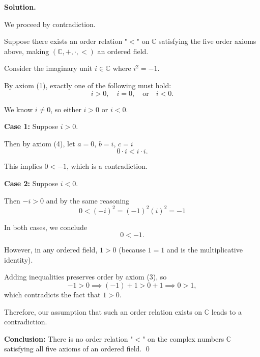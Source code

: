 \documentclass[12pt]{article}
\newenvironment{solution}{%
	\par\medskip
	\noindent\textbf{Solution.}\par\nopagebreak
}{%
	\hfill \qed \par\medskip
}
\begin{document}
\begin{solution}
	We proceed by contradiction.
	
	Suppose there exists an order relation "$<$" on $\mathbb{C}$ satisfying the five order axioms above, making $(\mathbb{C}, +, \cdot, <)$ an ordered field.
	
	Consider the imaginary unit $i \in \mathbb{C}$ where $i^2 = -1$.
	
	By axiom (1), exactly one of the following must hold:
	\[
	i > 0, \quad i = 0, \quad \text{or} \quad i < 0.
	\]
	
	We know $i \neq 0$, so either $i > 0$ or $i < 0$.
	
	\textbf{Case 1:} Suppose $i > 0$.
	
	Then by axiom (4), let $a = 0$, $b = i$, $c = i$
	\[
	0 \cdot i < i \cdot i.
	\]
	
	This implies $0 < -1$, which is a contradiction.
	
	\textbf{Case 2:} Suppose $i < 0$.
	
	Then $-i > 0$ and by the same reasoning
	\[
	0 < (-i)^2 = (-1)^2(i)^2 = -1
	\]
	
	In both cases, we conclude
	\[
	0 < -1.
	\]
	
	However, in any ordered field, $1 > 0$ (because $1 = 1$ and is the multiplicative identity).
	
	Adding inequalities preserves order by axiom (3), so
	\[
	-1 > 0 \implies (-1) + 1 > 0 + 1 \implies 0 > 1,
	\]
	which contradicts the fact that $1 > 0$.
	
	Therefore, our assumption that such an order relation exists on $\mathbb{C}$ leads to a contradiction.
	
	\medskip
	
	\noindent\textbf{Conclusion:} There is no order relation "$<$" on the complex numbers $\mathbb{C}$ satisfying all five axioms of an ordered field.
\end{solution}
\end{document}
